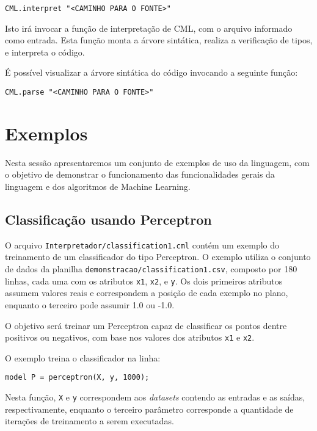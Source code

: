 \documentclass[12pt]{article}
\begin{document}
\begin{verbatim}
CML.interpret "<CAMINHO PARA O FONTE>"
\end{verbatim}

Isto irá invocar a função de interpretação de CML, com o arquivo informado como entrada. Esta função monta a árvore sintática, realiza a verificação de tipos, e interpreta o código.

É possível visualizar a árvore sintática do código invocando a seguinte função:

\begin{verbatim}
CML.parse "<CAMINHO PARA O FONTE>"
\end{verbatim}

\section{Exemplos}

Nesta sessão apresentaremos um conjunto de exemplos de uso da linguagem, com o objetivo de demonstrar o funcionamento das funcionalidades gerais da linguagem e dos algoritmos de Machine Learning.

\subsection{Classificação usando Perceptron}

O arquivo \texttt{Interpretador/classification1.cml} contém um exemplo do treinamento de um classificador do tipo Perceptron. O exemplo utiliza o conjunto de dados da planilha \texttt{demonstracao/classification1.csv}, composto por 180 linhas, cada uma com os atributos \texttt{x1}, \texttt{x2}, e \texttt{y}. Os dois primeiros atributos assumem valores reais e correspondem a posição de cada exemplo no plano, enquanto o terceiro pode assumir 1.0 ou -1.0.

O objetivo será treinar um Perceptron capaz de classificar os pontos dentre positivos ou negativos, com base nos valores dos atributos \texttt{x1} e \texttt{x2}.

O exemplo treina o classificador na linha:

\begin{verbatim}
model P = perceptron(X, y, 1000);
\end{verbatim}

Nesta função, \texttt{X} e \texttt{y} correspondem aos \textit{datasets} contendo as entradas e as saídas, respectivamente, enquanto o terceiro parâmetro corresponde a quantidade de iterações de treinamento a serem executadas.
\end{document}
